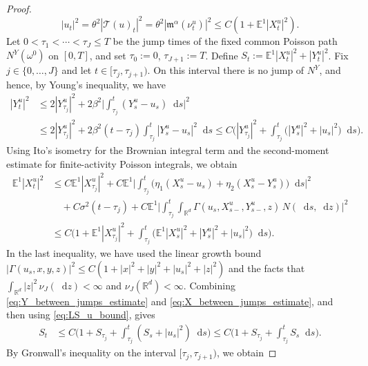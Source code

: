\documentclass{article}
\def\m{\mathfrak{m}}
\newcommand{\E}{\mathbb{E}}
\newcommand*\der{\mathop{}\!\mathrm{d}}
\numberwithin{equation}{section}
\begin{document}
\begin{proof}
\begin{equation}
    |u_t|^2 = \theta^2 | \mathcal{T}(u)_t|^2 = \theta^2 |\m^\alpha(\nu_t^u)|^2  
    \le
    C(1+\mathbb E^1|X_t^u|^2).
    \label{eq:LS_u_bound}
\end{equation}
Let $0<\tau_1<\cdots<\tau_J\leq T $
be the jump times of the fixed common Poisson path $N^Y(\omega^0)$ on
$[0,T]$, and set $\tau_0:=0$, $\tau_{J+1}:=T$. Define $S_t:=\E^1|X_t^u|^2+|Y_t^u|^2$.  Fix $j\in\{0,\ldots,J\}$ and let $t\in[\tau_j,\tau_{j+1})$. On this interval there is no jump of $N^Y$, and hence, by Young's inequality, we have
\begin{align}
    |Y_t^u|^2
    &\le 2|Y_{\tau_j}^u|^2 + 2\beta^2
    \Big| \int_{\tau_j}^t (Y_s^u-u_s)\der s
    \Big|^2
    \nonumber\\
    &\leq 2|Y_{\tau_j}^u|^2
    +  2\beta^2(t-\tau_j)
    \int_{\tau_j}^t |Y_s^u-u_s|^2\der s
\le C\Big(|Y_{\tau_j}^u|^2 + \int_{\tau_j}^t
        \bigl(|Y_s^u|^2+|u_s|^2\bigr)\der s\Big).
    \label{eq:Y_between_jumps_estimate}
\end{align}
Using Ito's isometry for the
Brownian integral term and the second-moment estimate for finite-activity
Poisson integrals, we obtain
\begin{align}
    \E^1|X_t^u|^2
    &\le C\E^1|X_{\tau_j}^u|^2
    + C\mathbb E^1
    \Big|\int_{\tau_j}^t
        \big(\eta_1(X_s^u-u_s) + \eta_2(X_s^u-Y_s^u)\big)\der s \Big|^2 \nonumber\\
    &\quad   + C\sigma^2(t-\tau_j) + C\mathbb E^1
    \Big|\int_{\tau_j}^t\int_{\mathbb R^d}
        \Gamma(u_s,X_{s-}^u,Y_{s-}^u,z)\,N(\der s,\der z)\Big|^2
    \nonumber\\ 
    &\le C\Big(1+\E^1|X_{\tau_j}^u|^2
        + \int_{\tau_j}^t
        \big(\E^1|X_s^u|^2 + |Y_s^u|^2 +  |u_s|^2
        \big)\der s
    \Big).
    \label{eq:X_between_jumps_estimate}
\end{align}
In the last inequality, we have used the linear growth bound $|\Gamma(u_s,x,y,z)|^2 \leq C(1+|x|^2+|y|^2+|u_s|^2+|z|^2) $ 
and the facts that $\int_{\mathbb R^d}|z|^2\,\nu_J(\der z)<\infty$ and $\nu_J(\mathbb R^d)<\infty$. Combining \eqref{eq:Y_between_jumps_estimate} and
\eqref{eq:X_between_jumps_estimate}, and then using
\eqref{eq:LS_u_bound}, gives
\begin{align}
    S_t &\leq  C\Big(
        1+S_{\tau_j} + \int_{\tau_j}^t (S_s+|u_s|^2)\der s
    \Big) \leq
    C\Big(
        1+S_{\tau_j}
        +
        \int_{\tau_j}^t S_s\der s
    \Big).
    \label{eq:S_between_jumps}
\end{align}
By Gronwall's inequality on the interval $[\tau_j,\tau_{j+1})$, we obtain

\end{proof}
\end{document}
